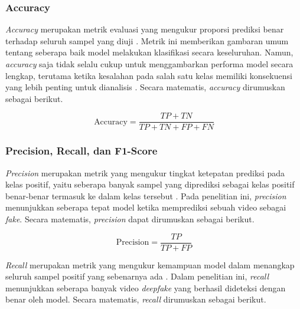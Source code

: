 \subsubsection{Accuracy} \label{II.Teori7.2}
\textit{Accuracy} merupakan metrik evaluasi yang mengukur proporsi prediksi benar terhadap seluruh sampel yang diuji \cite{SOKOLOVA2009427}. Metrik ini memberikan gambaran umum tentang seberapa baik model melakukan klasifikasi secara keseluruhan. Namun, \textit{accuracy} saja tidak selalu cukup untuk menggambarkan performa model secara lengkap, terutama ketika kesalahan pada salah satu kelas memiliki konsekuensi yang lebih penting untuk dianalisis \cite{SOKOLOVA2009427}\cite{powers2020evaluationprecisionrecallfmeasure}. Secara matematis, \textit{accuracy} dirumuskan sebagai berikut.

\vspace{0.5\baselineskip}
\begin{equation}
\mathrm{\text{Accuracy}} = \frac{TP + TN}{TP + TN + FP + FN}
\label{eq:accuracy}
\end{equation}
\vspace{0.5\baselineskip}

\subsubsection{Precision, Recall, dan F1-Score} \label{II.Teori7.3}
\textit{Precision} merupakan metrik yang mengukur tingkat ketepatan prediksi pada kelas positif, yaitu seberapa banyak sampel yang diprediksi sebagai kelas positif benar-benar termasuk ke dalam kelas tersebut \cite{SOKOLOVA2009427}\cite{powers2020evaluationprecisionrecallfmeasure}. Pada penelitian ini, \textit{precision} menunjukkan seberapa tepat model ketika memprediksi sebuah video sebagai \textit{fake}. Secara matematis, \textit{precision} dapat dirumuskan sebagai berikut.

\vspace{0.5\baselineskip}
\begin{equation}
\mathrm{\text{Precision}} = \frac{TP}{TP + FP}
\label{eq:precision}
\end{equation}
\vspace{0.5\baselineskip}

\textit{Recall} merupakan metrik yang mengukur kemampuan model dalam menangkap seluruh sampel positif yang sebenarnya ada \cite{SOKOLOVA2009427}\cite{powers2020evaluationprecisionrecallfmeasure}. Dalam penelitian ini, \textit{recall} menunjukkan seberapa banyak video \textit{deepfake} yang berhasil dideteksi dengan benar oleh model. Secara matematis, \textit{recall} dirumuskan sebagai berikut.

